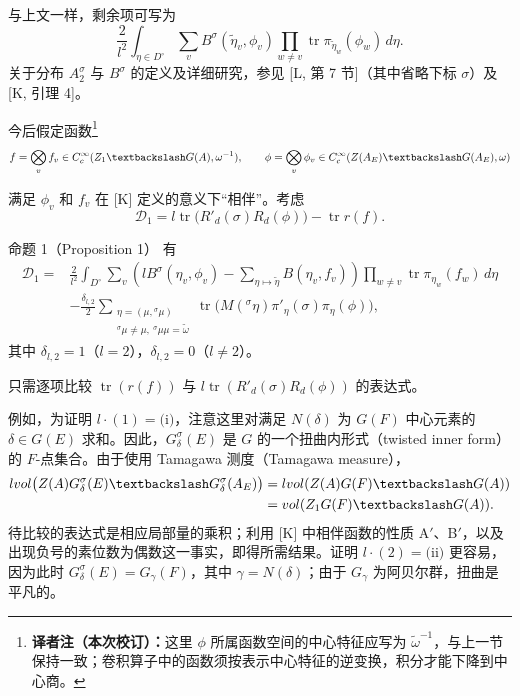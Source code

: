 与上文一样，剩余项可写为
\begin{equation}
 \frac2{l^2}\int_{\eta\in D^\circ}\sum_v B^\sigma(\widetilde\eta_v,\phi_v)
 \prod_{w\ne v}\operatorname{tr}\pi_{\widetilde\eta_w}(\phi_w)\,d\eta.
 \tag{7}
\end{equation}
关于分布 $A_2^\sigma$ 与 $B^\sigma$ 的定义及详细研究，参见 [L, 第 7 节]（其中省略下标 $\sigma$）及 [K, 引理 4]。

今后假定函数\footnote{\textbf{译者注（本次校订）：}这里 $\phi$ 所属函数空间的中心特征应写为 $\widetilde\omega^{-1}$，与上一节保持一致；卷积算子中的函数须按表示中心特征的逆变换，积分才能下降到中心商。}
\[
 f=\bigotimes_vf_v\in C_c^\infty(Z_1\backslash G(\A),\omega^{-1}),\qquad
 \phi=\bigotimes_v\phi_v\in C_c^\infty(Z(\A_E)\backslash G(\A_E),\widetilde\omega)
\]

满足 $\phi_v$ 和 $f_v$ 在 [K] 定义的意义下“相伴”。考虑
\[
 \mathcal D_1=l\operatorname{tr}\bigl(R'_d(\sigma)R_d(\phi)\bigr)-\operatorname{tr}r(f).
\]

\begin{originaltheorem}{命题 1（Proposition 1）}
有
\[
 \begin{aligned}
 \mathcal D_1={}&\frac2{l^2}\int_{D^\circ}\sum_v
 \left(lB^\sigma(\eta_v,\phi_v)
 -\sum_{\eta\mapsto\widetilde\eta}B(\eta_v,f_v)\right)
 \prod_{w\ne v}\operatorname{tr}\pi_{\eta_w}(f_w)\,d\eta\\
 &-\frac{\delta_{l,2}}2
 \sum_{\substack{\eta=(\mu,{}^\sigma\mu)\\{}^\sigma\mu\ne\mu,\ {}^\sigma\mu\mu=\widetilde\omega}}
 \operatorname{tr}\bigl(M({}^\sigma\eta)\pi'_\eta(\sigma)\pi_\eta(\phi)\bigr),
 \end{aligned}
\]
其中 $\delta_{l,2}=1$（$l=2$），$\delta_{l,2}=0$（$l\ne2$）。
\end{originaltheorem}

只需逐项比较 $\operatorname{tr}(r(f))$ 与 $l\operatorname{tr}(R'_d(\sigma)R_d(\phi))$ 的表达式。

例如，为证明 $l\cdot(1)=\text{(i)}$，注意这里对满足 $N(\delta)$ 为 $G(F)$ 中心元素的 $\delta\in G(E)$ 求和。因此，$G_\delta^\sigma(E)$ 是 $G$ 的一个扭曲内形式（twisted inner form）的 $F$-点集合。由于使用 Tamagawa 测度（Tamagawa measure），
\[
 \begin{aligned}
 l\operatorname{vol}\bigl(Z(\A)G_\delta^\sigma(E)\backslash G_\delta^\sigma(\A_E)\bigr)
 &=l\operatorname{vol}(Z(\A)G(F)\backslash G(\A))\\
 &=\operatorname{vol}(Z_1G(F)\backslash G(\A)).
 \end{aligned}
\]
待比较的表达式是相应局部量的乘积；利用 [K] 中相伴函数的性质 A$'$、B$'$，以及出现负号的素位数为偶数这一事实，即得所需结果。证明 $l\cdot(2)=\text{(ii)}$ 更容易，因为此时 $G_\delta^\sigma(E)=G_\gamma(F)$，其中 $\gamma=N(\delta)$；由于 $G_\gamma$ 为阿贝尔群，扭曲是平凡的。


